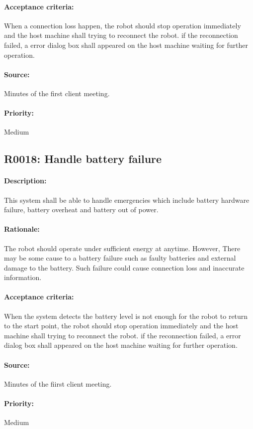 \documentclass[11pt, a4paper]{report}
\begin{document}
\paragraph{Acceptance criteria:}
When a connection loss happen, the robot should stop operation immediately and the host machine shall trying to reconnect the robot. if the reconnection failed, a error dialog box shall appeared on the host machine waiting for further operation.
\paragraph{Source:}
Minutes of the first client meeting.
\paragraph{Priority:}
Medium


\subsection{R0018: Handle battery failure}
\paragraph{Description:}
This system shall be able to handle emergencies which include battery hardware failure, battery overheat and battery out of power.
\paragraph{Rationale:}
The robot should operate under sufficient energy at anytime. However, There may be some cause to a battery failure such as faulty batteries and external damage to the battery. Such failure could cause connection loss and inaccurate information. 
\paragraph{Acceptance criteria:}
When the system detects the battery level is not enough for the robot to return to the start point, the robot should stop operation immediately and the host machine shall trying to reconnect the robot. if the reconnection failed, a error dialog box shall appeared on the host machine waiting for further operation.
\paragraph{Source:}
Minutes of the fiirst client meeting.
\paragraph{Priority:}
Medium
\end{document}
